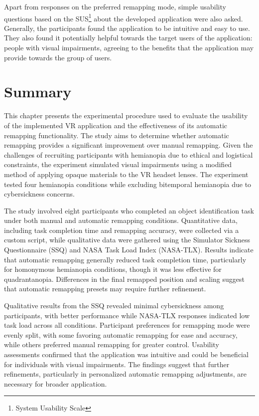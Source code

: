 \documentclass{l4proj}
\begin{document}
Apart from responses on the preferred remapping mode, simple usability questions based on the SUS\footnote{System Usability Scale} about the developed application were also asked. Generally, the participants found the application to be intuitive and easy to use. They also found it potentially helpful towards the target users of the application: people with visual impairments, agreeing to the benefits that the application may provide towards the group of users. 



\section{Summary}
This chapter presents the experimental procedure used to evaluate the usability of the implemented VR application and the effectiveness of its automatic remapping functionality. The study aims to determine whether automatic remapping provides a significant improvement over manual remapping. Given the challenges of recruiting participants with hemianopia due to ethical and logistical constraints, the experiment simulated visual impairments using a modified method of applying opaque materials to the VR headset lenses. The experiment tested four hemianopia conditions while excluding bitemporal hemianopia due to cybersickness concerns.  

The study involved eight participants who completed an object identification task under both manual and automatic remapping conditions. Quantitative data, including task completion time and remapping accuracy, were collected via a custom script, while qualitative data were gathered using the Simulator Sickness Questionnaire (SSQ) and NASA Task Load Index (NASA-TLX). Results indicate that automatic remapping generally reduced task completion time, particularly for homonymous hemianopia conditions, though it was less effective for quadrantanopia. Differences in the final remapped position and scaling suggest that automatic remapping presets may require further refinement.  

Qualitative results from the SSQ revealed minimal cybersickness among participants, with better performance  while NASA-TLX responses indicated low task load across all conditions. Participant preferences for remapping mode were evenly split, with some favoring automatic remapping for ease and accuracy, while others preferred manual remapping for greater control. Usability assessments confirmed that the application was intuitive and could be beneficial for individuals with visual impairments. The findings suggest that further refinements, particularly in personalized automatic remapping adjustments, are necessary for broader application.
\end{document}
